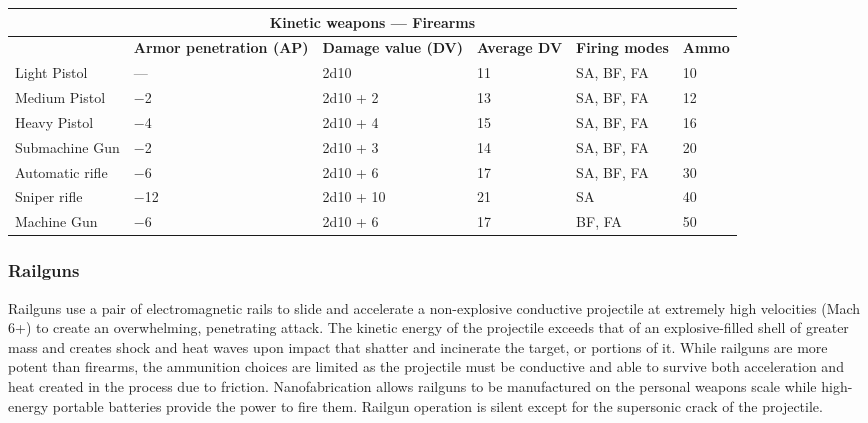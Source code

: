 \begin{table} \begin{tabularx}{\textwidth}{|l|X|X|X|l|l|} \hline

\multicolumn{6}{|c|}{\textbf{Kinetic weapons --- Firearms}} \\ \hline

&\textbf{Armor penetration (AP)}	&\textbf{Damage value (DV)}	&\textbf{Average DV}	&\textbf{Firing modes}	&\textbf{Ammo} \\ \hline

Light Pistol	&--- &2d10	&11	&SA, BF, FA	&10 \\ \hline

Medium Pistol	&$-$2	&2d10 + 2	&13	&SA, BF, FA	&12 \\ \hline

Heavy Pistol	&$-$4	&2d10 + 4	&15	&SA, BF, FA	&16 \\ \hline

Submachine Gun	&$-$2	&2d10 + 3	&14	&SA, BF, FA	&20 \\ \hline

Automatic rifle	&$-$6	&2d10 + 6	&17	&SA, BF, FA	&30 \\ \hline

Sniper rifle	&$-$12	&2d10 + 10	&21	&SA	&40 \\ \hline

Machine Gun	&$-$6	&2d10 + 6	&17	&BF, FA	&50 \\ \hline

\end{tabularx} \label{tab:kinetic-firearms} \end{table} 

\subsubsection{Railguns} 

Railguns use a pair of electromagnetic rails to slide and accelerate a non-explosive conductive projectile at extremely high velocities (Mach 6+) to create an overwhelming, penetrating attack. The kinetic energy of the projectile exceeds that of an explosive-filled shell of greater mass and creates shock and heat waves upon impact that shatter and incinerate the target, or portions of it. While railguns are more potent than firearms, the ammunition choices are limited as the projectile must be conductive and able to survive both acceleration and heat created in the process due to friction. Nanofabrication allows railguns to be manufactured on the personal weapons scale while high-energy portable batteries provide the power to fire them. Railgun operation is silent except for the supersonic crack of the projectile. 

